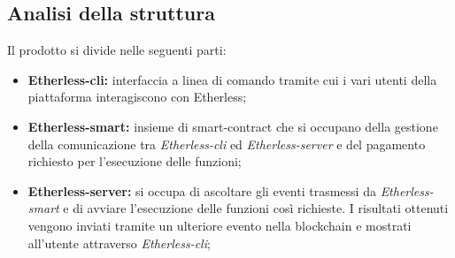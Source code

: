\subsection{Analisi della struttura}
Il prodotto si divide nelle seguenti parti: 
\begin{itemize}
	\item \textbf{Etherless-cli:} interfaccia a linea di comando tramite cui i vari utenti della piattaforma interagiscono con Etherless; 
	\item \textbf{Etherless-smart:} insieme di smart-contract che si occupano della gestione della comunicazione tra \textit{Etherless-cli} ed \textit{Etherless-server} e del pagamento richiesto per l'esecuzione delle funzioni; 
	\item \textbf{Etherless-server:} si occupa di ascoltare gli eventi trasmessi da \textit{Etherless-smart} e di avviare l'esecuzione delle funzioni così richieste. I risultati ottenuti vengono inviati tramite un ulteriore evento nella blockchain e mostrati all'utente attraverso \textit{Etherless-cli};  
\end{itemize}

